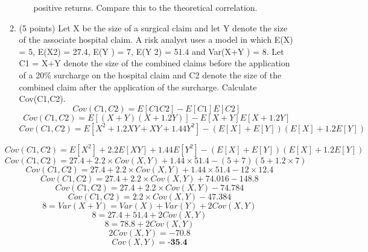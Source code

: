\documentclass[a3paper,12pt]{article} %
\begin{document}
\begin{enumerate}
\begin{enumerate}
\begin{enumerate}
        positive returns. Compare this to the theoretical correlation.
    \end{enumerate}
    \item (5 points) Let X be the size of a surgical claim and let Y denote the size of the associate hospital
    claim. A risk analyst uses a model in which E(X) = 5, E(X2) = 27.4, E(Y ) = 7, E(Y 2) = 51.4
    and Var(X+Y ) = 8. Let C1 = X+Y denote the size of the combined claims before the application
    of a 20\% surcharge on the hospital claim and C2 denote the size of the combined claim after the
    application of the surcharge. Calculate Cov(C1,C2).
    \[
        Cov(C1, C2) = E[C1C2] - E[C1]E[C2]
    \]
    \[
        Cov(C1, C2) = E[(X + Y)(X + 1.2Y)] - E[X + Y]E[X + 1.2Y]
    \]
    \[
        Cov(C1, C2) = E[X^2 + 1.2XY + XY + 1.44Y^2] - (E[X] + E[Y])(E[X] + 1.2E[Y])
    \]
    \end{enumerate}
    \[
        Cov(C1, C2) = E[X^2] + 2.2E[XY] + 1.44E[Y^2] - (E[X] + E[Y])(E[X] + 1.2E[Y])
    \]
    \[
        Cov(C1, C2) = 27.4 + 2.2 \times Cov(X, Y) + 1.44 \times 51.4 - (5 + 7)(5 + 1.2 \times 7)
    \]
    \[
        Cov(C1, C2) = 27.4 + 2.2 \times Cov(X, Y) + 1.44 \times 51.4 - 12 \times 12.4
    \]
    \[
        Cov(C1, C2) = 27.4 + 2.2 \times Cov(X, Y) + 74.016 - 148.8
    \]
    \[
        Cov(C1, C2) = 27.4 + 2.2 \times Cov(X, Y) - 74.784
    \]
    \[
        Cov(C1, C2) = 2.2 \times Cov(X, Y) - 47.384
    \]
    \[
        8 = Var(X + Y) = Var(X) + Var(Y) + 2Cov(X, Y)
    \]
    \[
        8 = 27.4 + 51.4 + 2Cov(X, Y)
    \]
    \[
        8 = 78.8 + 2Cov(X, Y)
    \]
    \[
        2Cov(X, Y) = -70.8
    \]
    \[
        Cov(X, Y) = \textbf{-35.4}
    \]
\end{enumerate}
\end{document}
